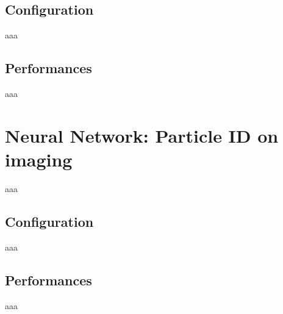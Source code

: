 \subsection{Configuration}
aaa

\subsection{Performances}
aaa

\section{Neural Network: Particle ID on imaging} \label{sec:NN_img}
aaa

\subsection{Configuration}
aaa

\subsection{Performances}
aaa